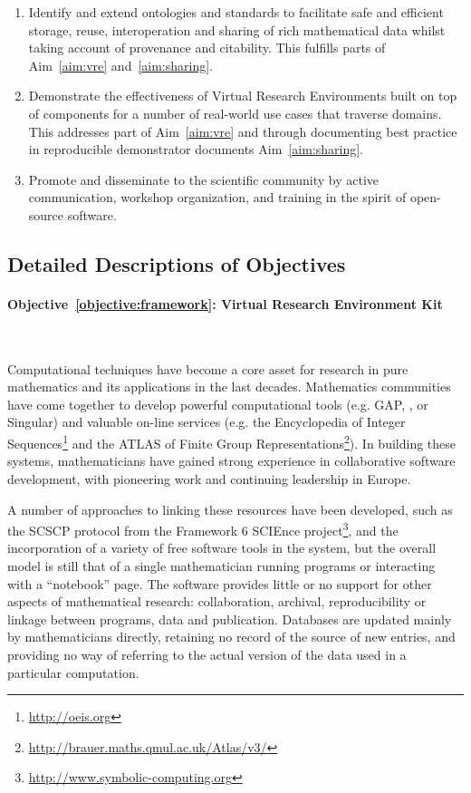 \documentclass[noworkareas,deliverables,\classoptions]{euproposal}       %
\begin{document}
\begin{proposal}
\begin{enumerate}
\item \label{objective:data} Identify and extend ontologies and
  standards to facilitate safe and efficient storage, reuse,
  interoperation and sharing of rich mathematical data whilst taking
  account of provenance and citability. This fulfills parts of
  Aim~\ref{aim:vre} and~\ref{aim:sharing}.

\item \label{objective:demo} Demonstrate the effectiveness of Virtual
  Research Environments built on top of \TheProject components for a
  number of real-world use cases that traverse domains. This addresses
  part of Aim~\ref{aim:vre} and through documenting best practice in
  reproducible demonstrator documents Aim~\ref{aim:sharing}.

\item \label{objective:disseminate} Promote and disseminate
  \TheProject to the scientific community by active communication,
  workshop organization, and training in the spirit of open-source
  software.


\end{enumerate}

\subsection*{Detailed Descriptions of Objectives} %

\paragraph{Objective~\ref{objective:framework}: Virtual Research
  Environment Kit}\ 

Computational techniques have become a core asset for research in pure
mathematics and its applications in the last decades. Mathematics
communities have come together to develop powerful computational
tools (e.g. GAP, \PariGP, \Sage or Singular) and valuable on-line
services (e.g. the Encyclopedia of Integer Sequences\footnote{\url{http://oeis.org}} and the ATLAS of Finite Group Representations\footnote{
\url{http://brauer.maths.qmul.ac.uk/Atlas/v3/}}). In building these
systems, mathematicians have gained strong experience in collaborative
software development, with pioneering work and continuing leadership
in Europe.

A number of approaches to linking these resources have been developed,
such as the SCSCP protocol from the Framework 6 SCIEnce
project\footnote{\url{http://www.symbolic-computing.org}}, and the
incorporation of a variety of free software tools in the \Sage system,
but the overall model is still that of a single mathematician running
programs or interacting with a ``notebook'' page. The software
provides little or no support for other aspects of mathematical
research: collaboration, archival, reproducibility or linkage between
programs, data and publication. Databases are updated mainly by
mathematicians directly, retaining no record of the source of new
entries, and providing no way of referring to the actual version of
the data used in a particular computation.


\end{proposal}
\end{document}
